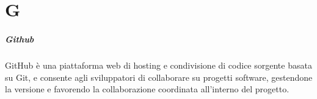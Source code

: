 \chapter{G}
\paragraph{Github}
GitHub è una piattaforma web di hosting e condivisione di codice sorgente  basata su Git,  e consente agli sviluppatori di collaborare su progetti software, gestendone la versione e favorendo la collaborazione coordinata all'interno del progetto.